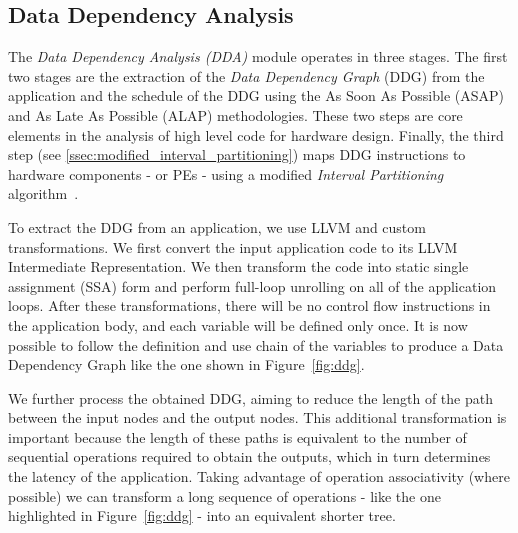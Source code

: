 \vspace{-1mm}
\subsection{Data Dependency Analysis}
\label{ssec:dda}
\vspace{-1mm}
The \textit{Data Dependency Analysis (DDA)} module operates in three stages. The first two stages are the extraction of the \textit{Data Dependency Graph} (DDG)\cite{isoda1983global} from the application and the schedule of the DDG using the As Soon As Possible (ASAP) and As Late As Possible (ALAP) methodologies. These two steps are core elements in the analysis of high level code for hardware design\cite{hwang1991formal}. Finally, the third step (see \ref{ssec:modified_interval_partitioning}) maps DDG instructions to hardware components - or PEs - using a modified \textit{Interval Partitioning} algorithm~\cite{greedyIntervalPartitioning}.

To extract the DDG from an application, we use LLVM  and custom transformations. We first convert the input application code to its LLVM Intermediate Representation. We then transform the code into static single assignment (SSA) form and perform full-loop unrolling on all of the application loops. After these transformations, there will be no control flow instructions in the application body, and each variable will be defined only once. It is now possible to follow the definition and use chain of the variables to produce a Data Dependency Graph like the one shown in Figure~\ref{fig:ddg}.

We further process the obtained DDG, aiming to reduce the length of the path between the input nodes and the output nodes. This additional transformation is important because the length of these paths is equivalent to the number of sequential operations required to obtain the outputs, which in turn determines the latency of the application. Taking advantage of operation associativity (where possible) we can transform a long sequence of operations - like the one highlighted in Figure~\ref{fig:ddg} - into an equivalent shorter tree.

